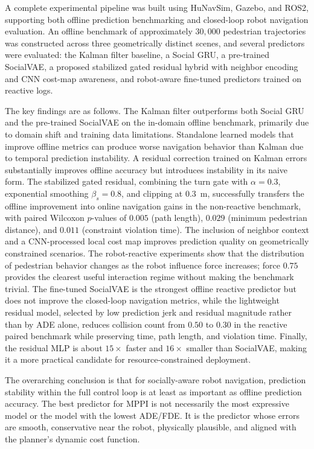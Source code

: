 \documentclass[12pt, a4paper]{article}
\begin{document}
A complete experimental pipeline was built using HuNavSim, Gazebo, and ROS2, supporting both offline prediction benchmarking and closed-loop robot navigation evaluation. An offline benchmark of approximately $30{,}000$ pedestrian trajectories was constructed across three geometrically distinct scenes, and several predictors were evaluated: the Kalman filter baseline, a Social GRU, a pre-trained SocialVAE, a proposed stabilized gated residual hybrid with neighbor encoding and CNN cost-map awareness, and robot-aware fine-tuned predictors trained on reactive logs.

The key findings are as follows. The Kalman filter outperforms both Social GRU and the pre-trained SocialVAE on the in-domain offline benchmark, primarily due to domain shift and training data limitations. Standalone learned models that improve offline metrics can produce worse navigation behavior than Kalman due to temporal prediction instability. A residual correction trained on Kalman errors substantially improves offline accuracy but introduces instability in its naive form. The stabilized gated residual, combining the turn gate with $\alpha=0.3$, exponential smoothing $\beta_s=0.8$, and clipping at $0.3$~m, successfully transfers the offline improvement into online navigation gains in the non-reactive benchmark, with paired Wilcoxon $p$-values of $0.005$ (path length), $0.029$ (minimum pedestrian distance), and $0.011$ (constraint violation time). The inclusion of neighbor context and a CNN-processed local cost map improves prediction quality on geometrically constrained scenarios. The robot-reactive experiments show that the distribution of pedestrian behavior changes as the robot influence force increases; force $0.75$ provides the clearest useful interaction regime without making the benchmark trivial. The fine-tuned SocialVAE is the strongest offline reactive predictor but does not improve the closed-loop navigation metrics, while the lightweight residual model, selected by low prediction jerk and residual magnitude rather than by ADE alone, reduces collision count from $0.50$ to $0.30$ in the reactive paired benchmark while preserving time, path length, and violation time. Finally, the residual MLP is about $15\times$ faster and $16\times$ smaller than SocialVAE, making it a more practical candidate for resource-constrained deployment.

The overarching conclusion is that for socially-aware robot navigation, prediction stability within the full control loop is at least as important as offline prediction accuracy. The best predictor for MPPI is not necessarily the most expressive model or the model with the lowest ADE/FDE. It is the predictor whose errors are smooth, conservative near the robot, physically plausible, and aligned with the planner's dynamic cost function.
\end{document}
